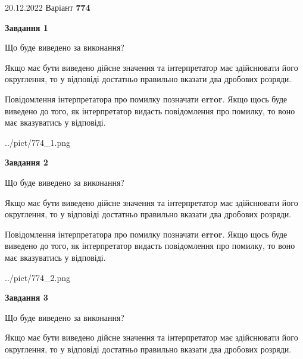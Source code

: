 \documentclass[12pt, ukrainian]{article}
\begin{document}
{20.12.2022 Варіант \No \textbf { 774 }\par}
{
\begin {Large}

{\begin {center}\textbf{Завдання 1}\end {center}}\par
Що буде виведено за виконання? \par

Якщо має бути виведено дійсне значення та інтерпретатор має здійснювати його округлення, 
то у відповіді достатньо правильно вказати два дробових розряди.

Повідомлення інтерпретатора про помилку позначати \textbf{error}.
Якщо щось буде виведено до того, як інтерпретатор видасть повідомлення про помилку, 
то воно має вказуватись у відповіді. \par

\begin{center}
	{../pict/774_1.png}
\end{center}
\newpage

{\begin {center}\textbf{Завдання 2}\end {center}}\par
Що буде виведено за виконання? \par

Якщо має бути виведено дійсне значення та інтерпретатор має здійснювати його округлення, 
то у відповіді достатньо правильно вказати два дробових розряди.

Повідомлення інтерпретатора про помилку позначати \textbf{error}.
Якщо щось буде виведено до того, як інтерпретатор видасть повідомлення про помилку, 
то воно має вказуватись у відповіді. \par

\begin{center}
	{../pict/774_2.png}
\end{center}
\newpage

{\begin {center}\textbf{Завдання 3}\end {center}}\par
Що буде виведено за виконання? \par

Якщо має бути виведено дійсне значення та інтерпретатор має здійснювати його округлення, 
то у відповіді достатньо правильно вказати два дробових розряди.


\end{Large}}
\end{document}
